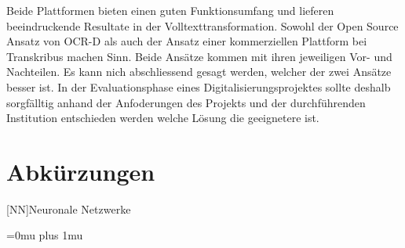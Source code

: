 \documentclass[a4paper,oneside, 12pt]{report}
\begin{document}
Beide Plattformen bieten einen guten Funktionsumfang und lieferen beeindruckende Resultate in der Volltexttransformation. Sowohl der Open Source Ansatz von OCR-D als auch der Ansatz einer kommerziellen Plattform bei Transkribus machen Sinn. Beide Ansätze kommen mit ihren jeweiligen Vor- und Nachteilen. Es kann nich abschliessend gesagt werden, welcher der zwei Ansätze besser ist. In der Evaluationsphase eines Digitalisierungsprojektes sollte deshalb sorgfälltig anhand der Anfoderungen des Projekts und der durchführenden Institution entschieden werden welche Lösung die geeignetere ist.


\cleardoublepage
{}
{}
\chapter*{Abkürzungen}
\begin{acronym}[Abkürzungen]
    [NN]{Neuronale Netzwerke}
\end{acronym}

\cleardoublepage
{}
{}
\Urlmuskip=0mu plus 1mu\relax
\end{document}
